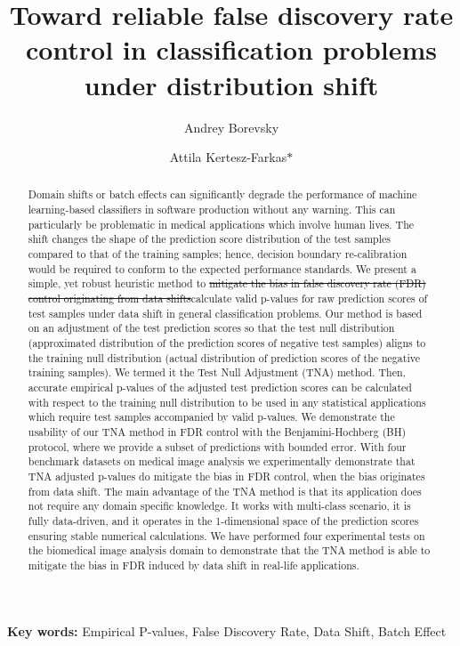 \documentclass{article}
\author{Andrey Borevsky}
\author{Attila Kertesz-Farkas$\ast$}
\affil{Laboratory on AI for Computational Biology, Faculty of Computer Science, HSE University,  11 Pokrovsky Bvld., Moscow 109028, Russian Federation}
\title{Toward reliable false discovery rate control in classification problems under distribution shift}
\newcommand{\correction}[2]{{\color{red}\sout{#1}}{\color{red}#2}}
\newcommand{\edit}[1]{{\color{red}#1}}
\begin{document}
\maketitle

\begin{abstract}
	Domain shifts or batch effects can significantly degrade the performance of machine learning-based classifiers in software production without any warning. This can particularly be problematic in medical applications which involve human lives. The shift changes the shape of the prediction score distribution of the test samples compared to that of the training samples; hence, decision boundary re-calibration would be required to conform to the expected performance standards. We present a simple, yet robust heuristic method to \correction{mitigate the bias in false discovery rate (FDR) control originating from data shifts}{calculate valid p-values for raw prediction scores of test samples under data shift in general classification problems.} Our method is based on an adjustment of the test prediction scores so that the test null distribution (approximated distribution of the prediction scores of negative test samples) aligns to the training null distribution (actual distribution of prediction scores of the negative training samples). We termed it the Test Null Adjustment (TNA) method. Then, accurate empirical p-values of the adjusted test prediction scores can be calculated with respect to the training null distribution to be used \edit{ in any statistical applications which require test samples accompanied by valid p-values. We demonstrate the usability of our TNA method in FDR control with the Benjamini-Hochberg (BH) protocol, where we provide a subset of predictions with bounded error. With four benchmark datasets on medical image analysis we experimentally demonstrate that TNA adjusted p-values do mitigate the bias in FDR control, when the bias originates from data shift.} The main advantage of the TNA method is that its application does not require any domain specific knowledge. It works with multi-class scenario, it is fully data-driven, and it operates in the 1-dimensional space of the prediction scores ensuring stable numerical calculations. We have performed four experimental tests on the biomedical image analysis domain to demonstrate that the TNA method is able to mitigate the bias in FDR induced by data shift in real-life applications. 


\end{abstract}
\textbf{Key words:} Empirical P-values, False Discovery Rate, Data Shift, Batch Effect
\end{document}
